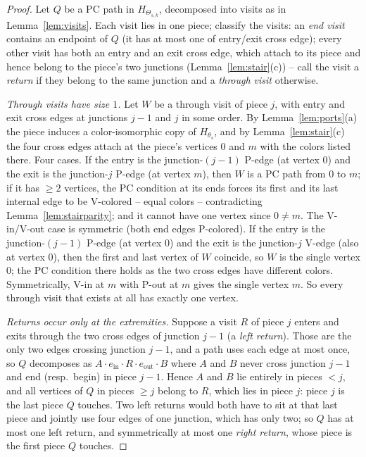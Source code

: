 \documentclass[11pt]{article}
\theoremstyle{definition}
\begin{document}
\begin{proof}
Let $Q$ be a PC path in $H_{\Theta_{s,k}}$, decomposed into visits as in
Lemma~\ref{lem:visits}. Each visit lies in one piece; classify the visits:
an \emph{end visit} contains an endpoint of $Q$ (it has at most one of entry/exit
cross edge); every other visit has both an entry and an exit cross edge, which attach
to its piece and hence belong to the piece's two junctions
(Lemma~\ref{lem:stair}(c)) -- call the visit a \emph{return} if they belong to the
same junction and a \emph{through visit} otherwise.

\emph{Through visits have size $1$.} Let $W$ be a through visit of piece $j$, with
entry and exit cross edges at junctions $j-1$ and $j$ in some order. By
Lemma~\ref{lem:ports}(a) the piece induces a color-isomorphic copy of $H_{\theta_s}$,
and by Lemma~\ref{lem:stair}(c) the four cross edges attach at the piece's vertices
$0$ and $m$ with the colors listed there. Four cases.
If the entry is the junction-$(j-1)$ P-edge (at vertex $0$) and the exit is the
junction-$j$ P-edge (at vertex $m$), then $W$ is a PC path from $0$ to $m$; if it has
$\ge 2$ vertices, the PC condition at its ends forces its first and its last internal
edge to be V-colored -- equal colors -- contradicting Lemma~\ref{lem:stairparity};
and it cannot have one vertex since $0 \ne m$. The V-in/V-out case is symmetric (both
end edges P-colored). If the entry is the junction-$(j-1)$ P-edge (at vertex $0$) and
the exit is the junction-$j$ V-edge (also at vertex $0$), then the first and last
vertex of $W$ coincide, so $W$ is the single vertex $0$; the PC condition there holds
as the two cross edges have different colors. Symmetrically, V-in at $m$ with P-out at
$m$ gives the single vertex $m$. So every through visit that exists at all has exactly
one vertex.

\emph{Returns occur only at the extremities.} Suppose a visit $R$ of piece $j$ enters
and exits through the two cross edges of junction $j-1$ (a \emph{left return}). Those
are the only two edges crossing junction $j-1$, and a path uses each edge at most
once, so $Q$ decomposes as $A \cdot e_{\mathrm{in}} \cdot R \cdot e_{\mathrm{out}}
\cdot B$ where $A$ and $B$ never cross junction $j-1$ and end (resp.\ begin) in piece
$j-1$. Hence $A$ and $B$ lie entirely in pieces $< j$, and all vertices of $Q$ in
pieces $\ge j$ belong to $R$, which lies in piece $j$: piece $j$ is the last piece $Q$
touches. Two left returns would both have to sit at that last piece and jointly use
four edges of one junction, which has only two; so $Q$ has at most one left return,
and symmetrically at most one \emph{right return}, whose piece is the first piece $Q$
touches.


\end{proof}
\end{document}
